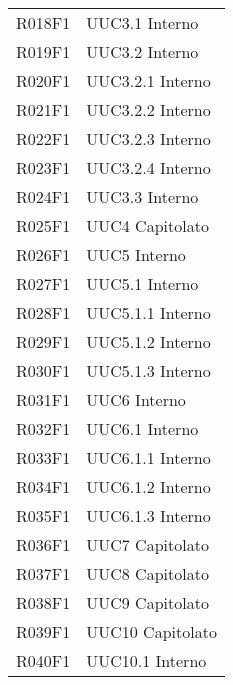 \documentclass[../analisi-dei-requisiti.tex]{subfiles}
\begin{document}
\begin{longtable}[H]{ p{4cm} | p{4cm} }
  R018F1                               & UUC3.1 Interno                \\
  R019F1                               & UUC3.2 Interno                \\
  R020F1                               & UUC3.2.1 Interno              \\
  R021F1                               & UUC3.2.2 Interno              \\
  R022F1                               & UUC3.2.3 Interno              \\
  R023F1                               & UUC3.2.4 Interno              \\
  R024F1                               & UUC3.3 Interno                \\
  R025F1                               & UUC4 Capitolato               \\
  R026F1                               & UUC5 Interno                  \\
  R027F1                               & UUC5.1 Interno                \\
  R028F1                               & UUC5.1.1 Interno              \\
  R029F1                               & UUC5.1.2 Interno              \\
  R030F1                               & UUC5.1.3 Interno              \\
  R031F1                               & UUC6 Interno                  \\
  R032F1                               & UUC6.1 Interno                \\
  R033F1                               & UUC6.1.1 Interno              \\
  R034F1                               & UUC6.1.2 Interno              \\
  R035F1                               & UUC6.1.3 Interno              \\
  R036F1                               & UUC7 Capitolato               \\
  R037F1                               & UUC8 Capitolato               \\
  R038F1                               & UUC9 Capitolato               \\
  R039F1                               & UUC10 Capitolato              \\
  R040F1                               & UUC10.1 Interno               \\

\end{longtable}
\end{document}
